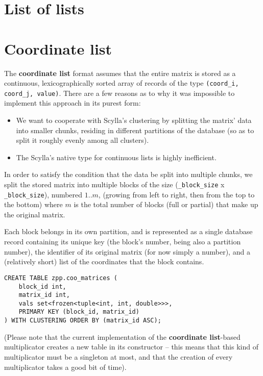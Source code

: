 \documentclass{article}
\newcommand{\code}[0]{\texttt}
\begin{document}
\pagebreak
\section{List of lists}

\pagebreak
\section{Coordinate list}

The \textbf{coordinate list} format assumes that the entire matrix is stored as a continuous, lexicographically sorted array of records of the type \code{(coord\_i, coord\_j, value)}. There are a few reasons as to why it was impossible to implement this approach in its purest form:

\begin{itemize}
\item We want to cooperate with Scylla's clustering by splitting the matrix' data into smaller chunks, residing in different partitions of the database (so as to split it roughly evenly among all clusters).
\item The Scylla's native type for continuous lists is highly inefficient.
\end{itemize}

In order to satisfy the condition that the data be split into multiple chunks, we split the stored matrix into multiple blocks of the size (\code{\_block\_size} x \code{\_block\_size}), numbered $1..m$, (growing from left to right, then from the top to the bottom) where $m$ is the total number of blocks (full or partial) that make up the original matrix. 

Each block belongs in its own partition, and is represented as a single database record containing its unique key (the block's number, being also a partition number), the identifier of its original matrix (for now simply a number), and a (relatively short) list of the coordinates that the block contains.

\begin{lstlisting}[style=SQLStyle]
CREATE TABLE zpp.coo_matrices (
    block_id int, 
    matrix_id int, 
    vals set<frozen<tuple<int, int, double>>>, 
    PRIMARY KEY (block_id, matrix_id) 
) WITH CLUSTERING ORDER BY (matrix_id ASC);
\end{lstlisting}

(Please note that the current implementation of the \textbf{coordinate list}-based multiplicator creates a new table in its constructor -- this means that this kind of multiplicator must be a singleton at most, and that the creation of every multiplicator takes a good bit of time).
\end{document}
